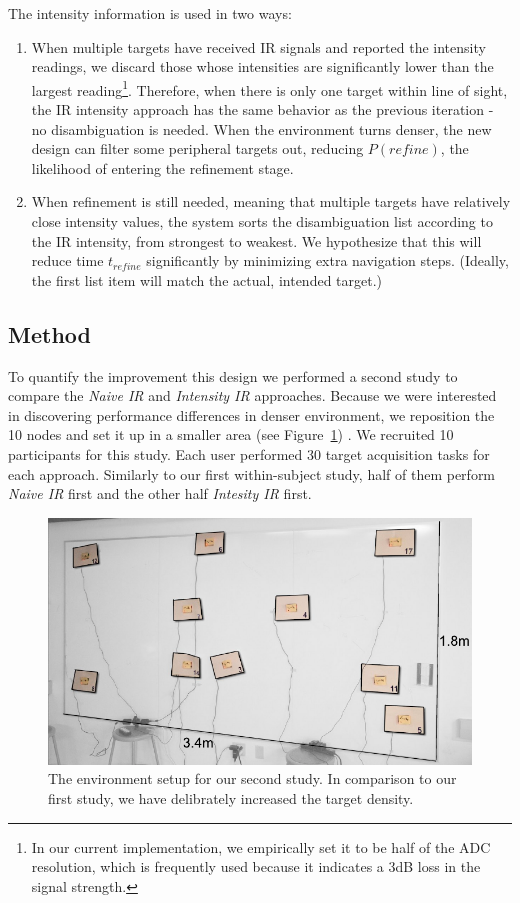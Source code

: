 The intensity information is used in two ways:
\begin{enumerate}
\item When multiple targets have received IR signals and reported the intensity readings, we discard those whose intensities are significantly lower than the largest reading\footnote{In our current implementation, we empirically set it to be half of the ADC resolution, which is frequently used because it indicates a 3dB loss in the signal strength.}. Therefore, when there is only one target within line of sight, the IR intensity approach has the same behavior as the previous iteration - no disambiguation is needed. When the environment turns denser, the new design can filter some peripheral targets out, reducing $P(refine)$, the likelihood of entering the refinement stage.
\item When refinement is still needed, meaning that multiple targets have relatively close intensity values, the system sorts the disambiguation list according to the IR intensity, from strongest to weakest. We hypothesize that this will reduce time $t_{refine}$ significantly by minimizing extra navigation steps. (Ideally, the first list item will match the actual, intended target.)
\end{enumerate}

\subsection{Method}
To quantify the improvement this design we performed a second study to compare the {\em Naive IR} and {\em Intensity IR} approaches. Because we were interested in discovering performance differences in denser environment, we reposition the 10 nodes and set it up in a smaller area (see Figure~\ref{fig:study-layout2}) . We recruited 10 participants for this study. Each  user performed 30 target acquisition tasks for each approach. Similarly to our first within-subject study, half of them perform {\em Naive IR} first and the other half {\em Intesity IR} first.

\begin{figure}[t]
\centering
\includegraphics[width=1.0\columnwidth]{figures/study-layout2.pdf}
\caption{The environment setup for our second study. In comparison to our first study, we have delibrately increased the target density.}
\label{fig:study-layout2}
\end{figure}

